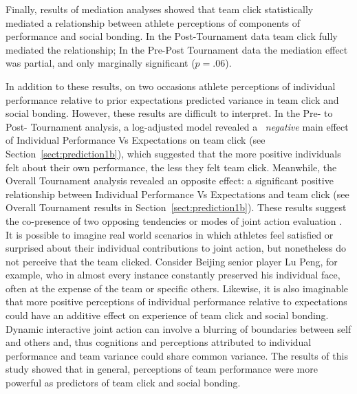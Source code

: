 \begin{CJK}{UTF8}{gbsn}

Finally, results of mediation analyses showed that team click statistically mediated a relationship between athlete perceptions of components of performance and social bonding. In the Post-Tournament data team click fully mediated the relationship; In the Pre-Post Tournament data the mediation effect was partial, and only marginally significant ($p = .06$).

In addition to these results, on two occasions athlete perceptions of individual performance relative to prior expectations predicted variance in team click and social bonding. However, these results are difficult to interpret.  In the Pre- to Post- Tournament analysis, a log-adjusted model revealed a ~\textit{negative} main effect of Individual Performance Vs Expectations on team click (see Section~\ref{sect:prediction1b}), which suggested that the more positive individuals felt about their own performance, the less they felt team click. Meanwhile, the Overall Tournament analysis revealed an opposite effect: a significant positive relationship between Individual Performance Vs Expectations and team click (see Overall Tournament results in Section~\ref{sect:prediction1b}). These results suggest the co-presence of two opposing tendencies or modes of joint action evaluation \citep{Friston2015a}. It is possible to imagine real world scenarios in which athletes feel satisfied or surprised about their individual contributions to joint action, but nonetheless do not perceive that the team clicked.  Consider Beijing senior player Lu Peng, for example, who in almost every instance constantly preserved his individual face, often at the expense of the team or specific others.  Likewise, it is also imaginable that more positive perceptions of individual performance relative to expectations could have an additive effect on experience of team click and social bonding.  Dynamic interactive joint action can involve a blurring of boundaries between self and others and, thus cognitions and perceptions attributed to individual performance and team variance could share common variance.  The results of this study showed that in general, perceptions of team performance were more powerful as predictors of team click and social bonding.




\end{CJK}
